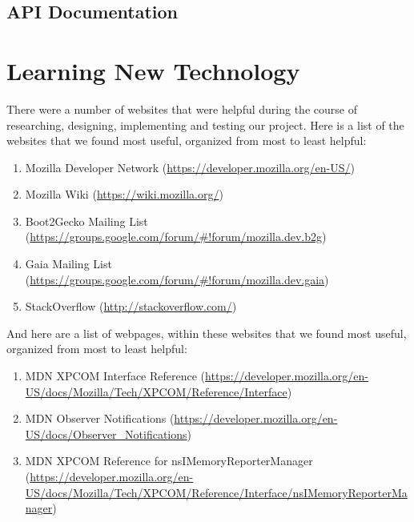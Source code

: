 \documentclass[12pt]{article}
\begin{document}
\subsection{API Documentation}

\pagebreak

\section{Learning New Technology}
There were a number of websites that were helpful during the course of researching, designing, implementing and testing our project. Here is a list of the websites that we found most useful, organized from most to least helpful:
\begin{enumerate}
	\item Mozilla Developer Network (\href{https://developer.mozilla.org/en-US/}{https://developer.mozilla.org/en-US/})
	\item Mozilla Wiki (\href{https://wiki.mozilla.org/}{https://wiki.mozilla.org/})
	\item Boot2Gecko Mailing List (\href{https://groups.google.com/forum/\#!forum/mozilla.dev.b2g}{https://groups.google.com/forum/\#!forum/mozilla.dev.b2g})
	\item Gaia Mailing List (\href{https://groups.google.com/forum/\#!forum/mozilla.dev.gaia}{https://groups.google.com/forum/\#!forum/mozilla.dev.gaia})
	\item StackOverflow (\href{http://stackoverflow.com/}{http://stackoverflow.com/})
\end{enumerate}

And here are a list of webpages, within these websites that we found most useful, organized from most to least helpful:
\begin{enumerate}
	\item MDN XPCOM Interface Reference (\href{https://developer.mozilla.org/en-US/docs/Mozilla/Tech/XPCOM/Reference/Interface}{https://developer.mozilla.org/en-US/docs/Mozilla/Tech/XPCOM/Reference/Interface})
	\item MDN Observer Notifications (\href{https://developer.mozilla.org/en-US/docs/Observer_Notifications}{https://developer.mozilla.org/en-US/docs/Observer\_Notifications})
	\item MDN XPCOM Reference for nsIMemoryReporterManager (\href{https://developer.mozilla.org/en-US/docs/Mozilla/Tech/XPCOM/Reference/Interface/nsIMemoryReporterManager}{https://developer.mozilla.org/en-US/docs/Mozilla/Tech/XPCOM/Reference/Interface/nsIMemoryReporterManager})
\end{enumerate}
\end{document}
